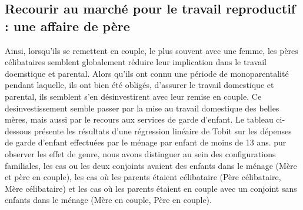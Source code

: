 \documentclass[
  12pt,
]{book}
\begin{document}
\subsection{Recourir au marché pour le travail reproductif : une affaire
de
père}\label{recourir-au-marchuxe9-pour-le-travail-reproductif-une-affaire-de-puxe8re}

Ainsi, lorsqu'ils se remettent en couple, le plus souvent avec une
femme, les pères célibataires semblent globalement réduire leur
implication dans le travail doemstique et parental. Alors qu'ils ont
connu une période de monoparentalité pendant laquelle, ils ont bien été
obligés, d'assurer le travail domestique et parental, ils semblent s'en
désinvestirent avec leur remise en couple. Ce desinvestissement semble
passer par la mise au travail domestique des belles mères, mais aussi
par le recours aux services de garde d'enfant. Le tableau ci-dessous
présente les résultats d'une régression linéaire de Tobit sur les
dépenses de garde d'enfant effectuées par le ménage par enfant de moins
de 13 ans. pur observer les effet de genre, nous avons distinguer au
sein des configurations familiales, les cas ou les deux conjoints
avaient des enfants dans le ménage (Mère et père en couple), les cas où
les parents étaient célibataire (Père célibataire, Mère célibataire) et
les cas où les parents étaient en couple avec un conjoint sans enfants
dans le ménage (Mère en couple, Père en couple).
\end{document}
